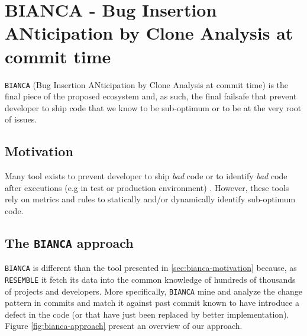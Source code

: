 
\section{BIANCA - Bug Insertion ANticipation by Clone Analysis at commit time\label{sec:BIANCA}}

{\tt BIANCA} (Bug Insertion ANticipation by Clone Analysis at commit time) is the final piece of the proposed ecosystem and, as such, the final failsafe that prevent developer to ship code that we know to be sub-optimum or to be at the very root of issues.

\subsection{Motivation\label{sec:bianca-motivation}}

Many tool exists to prevent developer to ship {\it bad} code \cite{Dangel2000,Hovemeyer2007,Moha2010} or to identify {\it bad} code after executions (e.g in test or production environment) \cite{Nayrolles,Nayrolles2013a}.
However, these tools rely on metrics and rules to statically and/or dynamically identify sub-optimum code.

\subsection{The {\tt BIANCA} approach\label{sec:bianca-approach}}

{\tt BIANCA} is different than the tool presented in \ref{sec:bianca-motivation} because, as {\tt RESEMBLE} it fetch its data into the common knowledge of hundreds of thousands of projects and developers.
More specifically, {\tt BIANCA} mine and analyze the change pattern in commits and match it against past commit known to have introduce a defect in the code (or that have just been replaced by better implementation). Figure \ref{fig:bianca-approach} present an overview of our approach.

